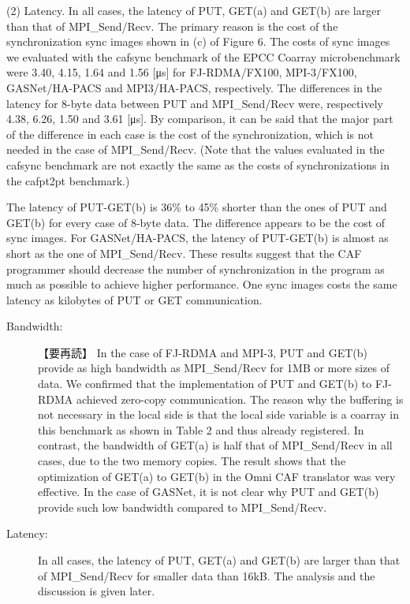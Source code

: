 (2) Latency. In all cases, the latency of PUT, GET(a) and GET(b) are larger than that of MPI\_Send/Recv. The primary reason is the cost of the synchronization sync images shown in (c) of Figure 6. The costs of sync images we evaluated with the cafsync benchmark of the EPCC Coarray microbenchmark were
3.40, 4.15, 1.64 and 1.56 [μs]
for FJ-RDMA/FX100, MPI-3/FX100, GASNet/HA-PACS and MPI3/HA-PACS, respectively. The differences in the latency for 8-byte data between PUT and MPI\_Send/Recv were, respectively
4.38, 6.26, 1.50 and 3.61 [μs].
By comparison, it can be said that the major part of the difference in each case is the cost of the synchronization, which is not needed in the case of MPI\_Send/Recv. (Note that the values evaluated in the cafsync benchmark are not exactly the same as the costs of synchronizations in the cafpt2pt benchmark.) 

The latency of PUT-GET(b) is 36\% to 45\% shorter than the ones of PUT and GET(b) for every case of 8-byte data. The difference appears to be the cost of sync images. For GASNet/HA-PACS, the latency of PUT-GET(b) is almost as short as the one of MPI\_Send/Recv.
These results suggest that the CAF programmer should decrease the number of synchronization in the program as much as possible to achieve higher performance. One sync images costs the same latency as kilobytes of PUT or GET communication.



\begin{description}
\item[Bandwidth:~] 【要再読】
In the case of FJ-RDMA and MPI-3, PUT and GET(b) provide as high 
bandwidth as MPI\_Send/Recv for 1MB or more sizes of data. We confirmed that 
the implementation of PUT and GET(b) to FJ-RDMA achieved zero-copy communication. 
The reason why the buffering is not necessary in the local side is that the local 
side variable is a coarray in this benchmark as shown in Table 2 and thus already 
registered. 
In contrast, the bandwidth of GET(a) is half that of MPI\_Send/Recv in all cases, 
due to the two memory copies. The result shows that the optimization of GET(a) 
to GET(b) in the Omni CAF translator was very effective. In the case of GASNet, 
it is not clear why PUT and GET(b) provide such low bandwidth compared to MPI\_Send/Recv.

\item[Latency:~]
In all cases, the latency of PUT, GET(a) and GET(b) are larger than that of 
MPI\_Send/Recv for smaller data than 16kB. The analysis and the discussion 
is given later.

\end{description}






